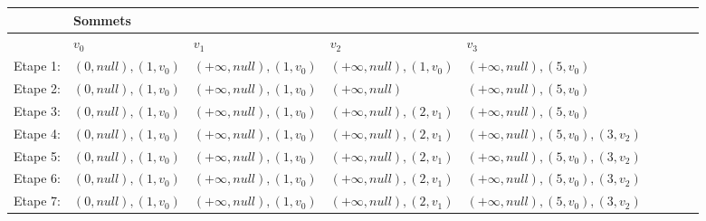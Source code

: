 \begin{exemple}
\begin{figure}[ht!]
\end{figure}

	

\begin{table}[]
\begin{tabular}{l|l|l|l|l|l|l|l|l|}
\cline{2-5}
                               & Sommets &    &    &      \\ \hline
\multicolumn{1}{|l|}{}         & $v_{0}$ &$v_{1}$  & $v_{2}$ &$v_{3}$  \\ \hline
\multicolumn{1}{|l|}{Etape 1:} & $(0,null),(1,v_{0})$   &$(+\infty,null),(1,v_{0})$     &$(+\infty,null),(1,v_{0})$    &$(+\infty,null),(5,v_{0})$    \\ \hline
\multicolumn{1}{|l|}{Etape 2:} &$(0,null),(1,v_{0})$         &$(+\infty,null),(1,v_{0})$    &$(+\infty,null)$    &$(+\infty,null),(5,v_{0})$     \\ \hline
\multicolumn{1}{|l|}{Etape 3:} &$(0,null),(1,v_{0})$         &$(+\infty,null),(1,v_{0})$    &$(+\infty,null),(2,v_{1})$    &$(+\infty,null),(5,v_{0})$  \\ \hline
\multicolumn{1}{|l|}{Etape 4:} &$(0,null),(1,v_{0})$         &$(+\infty,null),(1,v_{0})$    &$(+\infty,null),(2,v_{1})$    &$(+\infty,null),(5,v_{0}),(3,v_{2})$   \\ \hline
\multicolumn{1}{|l|}{Etape 5:}   &$(0,null),(1,v_{0})$         &$(+\infty,null),(1,v_{0})$    &$(+\infty,null),(2,v_{1})$    &$(+\infty,null),(5,v_{0}),(3,v_{2})$    \\ \hline 
\multicolumn{1}{|l|}{Etape 6:}   &$(0,null),(1,v_{0})$         &$(+\infty,null),(1,v_{0})$    &$(+\infty,null),(2,v_{1})$    &$(+\infty,null),(5,v_{0}),(3,v_{2})$     \\ \hline
\multicolumn{1}{|l|}{Etape 7:}   &$(0,null),(1,v_{0})$         &$(+\infty,null),(1,v_{0})$    &$(+\infty,null),(2,v_{1})$    &$(+\infty,null),(5,v_{0}),(3,v_{2})$   \\ \hline


\end{tabular}
\end{table}
\end{exemple}
